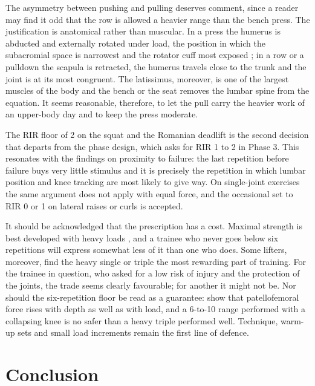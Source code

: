 \documentclass[11pt,a4paper]{article}
\begin{document}
The asymmetry between pushing and pulling deserves comment, since a reader may find it odd that the row is allowed a heavier range than the bench press. The justification is anatomical rather than muscular. In a press the humerus is abducted and externally rotated under load, the position in which the subacromial space is narrowest and the rotator cuff most exposed \citep{kolber2010}; in a row or a pulldown the scapula is retracted, the humerus travels close to the trunk and the joint is at its most congruent. The latissimus, moreover, is one of the largest muscles of the body and the bench or the seat removes the lumbar spine from the equation. It seems reasonable, therefore, to let the pull carry the heavier work of an upper-body day and to keep the press moderate.

The RIR floor of 2 on the squat and the Romanian deadlift is the second decision that departs from the phase design, which asks for RIR 1 to 2 in Phase 3. This resonates with the findings on proximity to failure: the last repetition before failure buys very little stimulus \citep{grgic2022,refalo2023} and it is precisely the repetition in which lumbar position and knee tracking are most likely to give way. On single-joint exercises the same argument does not apply with equal force, and the occasional set to RIR 0 or 1 on lateral raises or curls is accepted.

It should be acknowledged that the prescription has a cost. Maximal strength is best developed with heavy loads \citep{lopez2021,schoenfeld2017}, and a trainee who never goes below six repetitions will express somewhat less of it than one who does. Some lifters, moreover, find the heavy single or triple the most rewarding part of training. For the trainee in question, who asked for a low risk of injury and the protection of the joints, the trade seems clearly favourable; for another it might not be. Nor should the six-repetition floor be read as a guarantee: \citet{escamilla2001} show that patellofemoral force rises with depth as well as with load, and a 6-to-10 range performed with a collapsing knee is no safer than a heavy triple performed well. Technique, warm-up sets and small load increments remain the first line of defence.

\section*{Conclusion}
\end{document}
